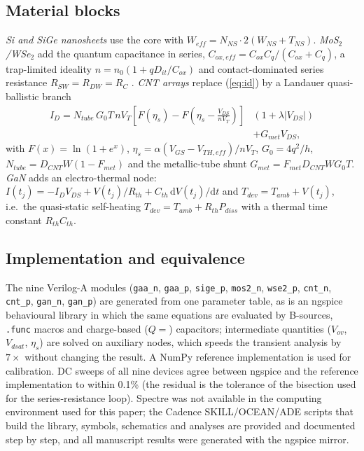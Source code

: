 \documentclass[journal]{IEEEtran}
\begin{document}
\subsection{Material blocks}
\emph{Si and SiGe nanosheets} use the core with $W_{eff}=N_{NS}\cdot 2(W_{NS}+T_{NS})$. \emph{MoS$_2$/WSe$_2$} add the quantum capacitance in series, $C_{ox,eff}=C_{ox}C_q/(C_{ox}+C_q)$, a trap-limited ideality $n=n_0(1+qD_{it}/C_{ox})$ and contact-dominated series resistance $R_{SW}=R_{DW}=R_C$ \cite{Pasadas2019,Li2023Nature}. \emph{CNT arrays} replace (\ref{eq:id}) by a Landauer quasi-ballistic branch \cite{Deng2007,Lundstrom2002}
\begin{align}
I_D = N_{tube}\,G_0 T\, nV_T\!\left[F(\eta_s)-F\!\left(\eta_s-\tfrac{V_{DS}}{nV_T}\right)\right]&(1+\lambda|V_{DS}|)\nonumber\\
&+ G_{met}V_{DS},
\end{align}
with $F(x)=\ln(1+e^x)$, $\eta_s=\alpha(V_{GS}-V_{TH,eff})/nV_T$, $G_0=4q^2/h$, $N_{tube}=D_{CNT}W(1-F_{met})$ and the metallic-tube shunt $G_{met}=F_{met}D_{CNT}WG_0T$. \emph{GaN} adds an electro-thermal node: $I(t_j)=-I_DV_{DS}+V(t_j)/R_{th}+C_{th}\,\mathrm{d}V(t_j)/\mathrm{d}t$ and $T_{dev}=T_{amb}+V(t_j)$, i.e.\ the quasi-static self-heating $T_{dev}=T_{amb}+R_{th}P_{diss}$ with a thermal time constant $R_{th}C_{th}$.

\subsection{Implementation and equivalence}
The nine Verilog-A modules (\texttt{gaa\_n}, \texttt{gaa\_p}, \texttt{sige\_p}, \texttt{mos2\_n}, \texttt{wse2\_p}, \texttt{cnt\_n}, \texttt{cnt\_p}, \texttt{gan\_n}, \texttt{gan\_p}) are generated from one parameter table, as is an ngspice behavioural library in which the same equations are evaluated by B-sources, \texttt{.func} macros and charge-based ($Q=$) capacitors; intermediate quantities ($V_{ov}$, $V_{dsat}$, $\eta_s$) are solved on auxiliary nodes, which speeds the transient analysis by $7\times$ without changing the result. A NumPy reference implementation is used for calibration. DC sweeps of all nine devices agree between ngspice and the reference implementation to within 0.1\% (the residual is the tolerance of the bisection used for the series-resistance loop). Spectre was not available in the computing environment used for this paper; the Cadence SKILL/OCEAN/ADE scripts that build the library, symbols, schematics and analyses are provided and documented step by step, and all manuscript results were generated with the ngspice mirror.
\end{document}
